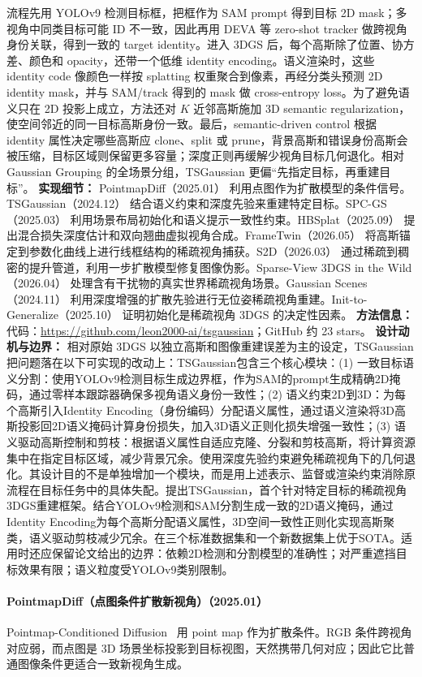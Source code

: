 流程先用 YOLOv9 检测目标框，把框作为 SAM prompt 得到目标 2D mask；多视角中同类目标可能 ID 不一致，因此再用 DEVA 等 zero-shot tracker 做跨视角身份关联，得到一致的 target identity。进入 3DGS 后，每个高斯除了位置、协方差、颜色和 opacity，还带一个低维 identity encoding。语义渲染时，这些 identity code 像颜色一样按 splatting 权重聚合到像素，再经分类头预测 2D identity mask，并与 SAM/track 得到的 mask 做 cross-entropy loss。为了避免语义只在 2D 投影上成立，方法还对 $K$ 近邻高斯施加 3D semantic regularization，使空间邻近的同一目标高斯身份一致。最后，semantic-driven control 根据 identity 属性决定哪些高斯应 clone、split 或 prune，背景高斯和错误身份高斯会被压缩，目标区域则保留更多容量；深度正则再缓解少视角目标几何退化。相对 Gaussian Grouping 的全场景分组，TSGaussian 更偏“先指定目标，再重建目标”。
\textbf{实现细节：} PointmapDiff（2025.01） 利用点图作为扩散模型的条件信号。TSGaussian（2024.12） 结合语义约束和深度先验来重建特定目标。SPC-GS（2025.03） 利用场景布局初始化和语义提示一致性约束。HBSplat（2025.09） 提出混合损失深度估计和双向翘曲虚拟视角合成。FrameTwin（2026.05） 将高斯锚定到参数化曲线上进行线框结构的稀疏视角捕获。S2D（2026.03） 通过稀疏到稠密的提升管道，利用一步扩散模型修复图像伪影。Sparse-View 3DGS in the Wild（2026.04） 处理含有干扰物的真实世界稀疏视角场景。Gaussian Scenes（2024.11） 利用深度增强的扩散先验进行无位姿稀疏视角重建。Init-to-Generalize（2025.10） 证明初始化是稀疏视角 3DGS 的决定性因素。
\textbf{方法信息：} 代码：\url{https://github.com/leon2000-ai/tsgaussian}；GitHub 约 23 stars。
\textbf{设计动机与边界：} 相对原始 3DGS 以独立高斯和图像重建误差为主的设定，TSGaussian 把问题落在以下可实现的改动上：TSGaussian包含三个核心模块：(1) 一致目标语义分割：使用YOLOv9检测目标生成边界框，作为SAM的prompt生成精确2D掩码，通过零样本跟踪器确保多视角语义身份一致性；(2) 语义约束2D到3D：为每个高斯引入Identity Encoding（身份编码）分配语义属性，通过语义渲染将3D高斯投影回2D语义掩码计算身份损失，加入3D语义正则化损失增强一致性；(3) 语义驱动高斯控制和剪枝：根据语义属性自适应克隆、分裂和剪枝高斯，将计算资源集中在指定目标区域，减少背景冗余。使用深度先验约束避免稀疏视角下的几何退化。其设计目的不是单独增加一个模块，而是用上述表示、监督或渲染约束消除原流程在目标任务中的具体失配。提出TSGaussian，首个针对特定目标的稀疏视角3DGS重建框架。结合YOLOv9检测和SAM分割生成一致的2D语义掩码，通过Identity Encoding为每个高斯分配语义属性，3D空间一致性正则化实现高斯聚类，语义驱动剪枝减少冗余。在三个标准数据集和一个新数据集上优于SOTA。适用时还应保留论文给出的边界：依赖2D检测和分割模型的准确性；对严重遮挡目标效果有限；语义粒度受YOLOv9类别限制。
\paragraph{PointmapDiff（点图条件扩散新视角）（2025.01）}
Pointmap-Conditioned Diffusion~\cite{2501_02913} 用 point map 作为扩散条件。RGB 条件跨视角对应弱，而点图是 3D 场景坐标投影到目标视图，天然携带几何对应；因此它比普通图像条件更适合一致新视角生成。

